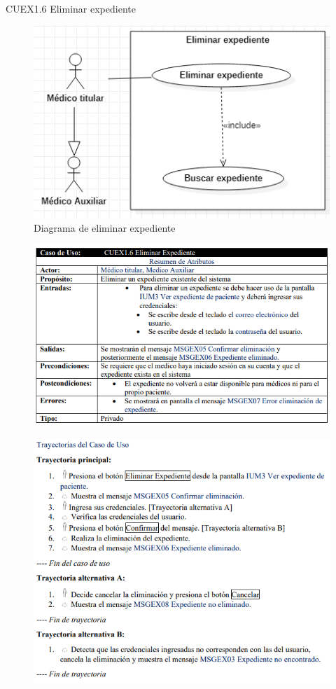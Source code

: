 \documentclass[12pt,letterpaper]{article}
\begin{document}
            \newpage
            CUEX1.6 Eliminar expediente
            \begin{figure}[H]
                \centering
                \includegraphics [scale=0.7]{casosUso/eliminarExpediente}
                \caption{Diagrama de eliminar expediente}
            \end{figure}
            \begin{figure}[H]
                \centering
                \includegraphics [scale=0.8]{specs/specEliminarExpediente}
            \end{figure}
            \begin{figure}[H]
                \centering
                \includegraphics [scale=0.9]{specs/trayEliminarExpediente}
            \end{figure}
\end{document}
